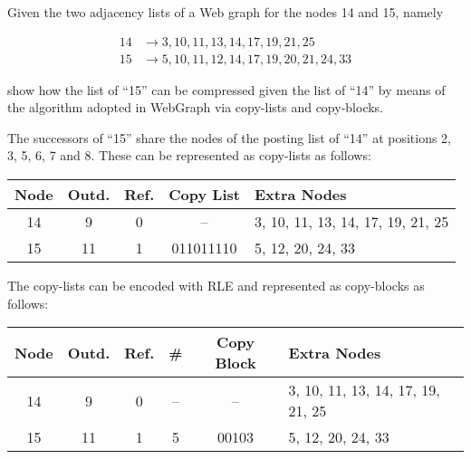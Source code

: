 \exercise

Given the two adjacency lists of a Web graph for the nodes 14 and 15, namely

\begin{align*}
	14 &\rightarrow 3, 10, 11, 13, 14, 17, 19, 21, 25 \\
	15 &\rightarrow 5, 10, 11, 12, 14, 17, 19, 20, 21, 24, 33
\end{align*}

show how the list of ``15'' can be compressed given the list of ``14'' by means
of the algorithm adopted in WebGraph via copy-lists and copy-blocks.

\solution

The successors of ``15'' share the nodes of the posting list of ``14'' at
positions 2, 3, 5, 6, 7 and 8. These can be represented as copy-lists as
follows:
%
\begin{longtable}{|c|c|c|c|l|}
  \hline
  Node & Outd. & Ref. & Copy List & Extra Nodes \\ \hline
  14 & 9  & 0 & --        & 3, 10, 11, 13, 14, 17, 19, 21, 25 \\
  15 & 11 & 1 & 011011110 & 5, 12, 20, 24, 33 \\ \hline
\end{longtable}
%
The copy-lists can be encoded with RLE and represented as copy-blocks as
follows:
%
\begin{longtable}{|c|c|c|c|c|l|}
  \hline
  Node & Outd. & Ref. & \# & Copy Block & Extra Nodes \\ \hline
  14 & 9  & 0 & -- & --    & 3, 10, 11, 13, 14, 17, 19, 21, 25 \\
  15 & 11 & 1 & 5  & 00103 & 5, 12, 20, 24, 33 \\ \hline
\end{longtable}
